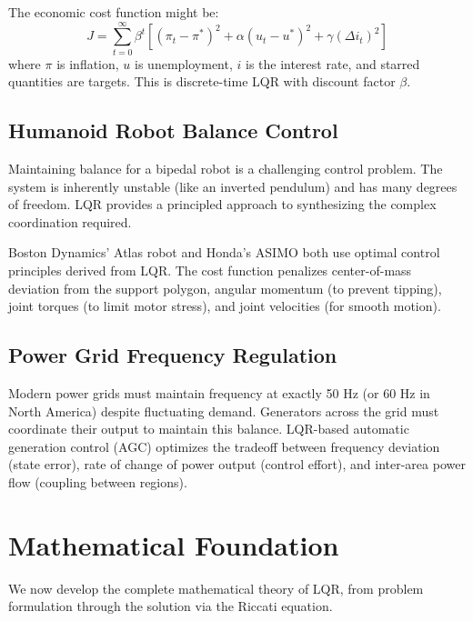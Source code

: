 The economic cost function might be:
\begin{equation}
J = \sum_{t=0}^\infty \beta^t \left[ (\pi_t - \pi^*)^2 + \alpha (u_t - u^*)^2 + \gamma (\Delta i_t)^2 \right]
\end{equation}
where $\pi$ is inflation, $u$ is unemployment, $i$ is the interest rate, and starred quantities are targets. This is discrete-time LQR with discount factor $\beta$.

\subsection{Humanoid Robot Balance Control}

Maintaining balance for a bipedal robot is a challenging control problem. The system is inherently unstable (like an inverted pendulum) and has many degrees of freedom. LQR provides a principled approach to synthesizing the complex coordination required.

Boston Dynamics' Atlas robot and Honda's ASIMO both use optimal control principles derived from LQR. The cost function penalizes center-of-mass deviation from the support polygon, angular momentum (to prevent tipping), joint torques (to limit motor stress), and joint velocities (for smooth motion).

\subsection{Power Grid Frequency Regulation}

Modern power grids must maintain frequency at exactly 50 Hz (or 60 Hz in North America) despite fluctuating demand. Generators across the grid must coordinate their output to maintain this balance. LQR-based automatic generation control (AGC) optimizes the tradeoff between frequency deviation (state error), rate of change of power output (control effort), and inter-area power flow (coupling between regions).


\section{Mathematical Foundation}
\label{sec:lqr_math}

We now develop the complete mathematical theory of LQR, from problem formulation through the solution via the Riccati equation.

